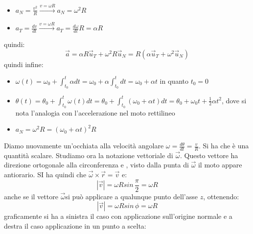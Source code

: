 \documentclass[a4paper,12pt, oneside]{book}
\begin{document}
\begin{itemize}
\item $a_N=\frac{v^2}{R}\xrightarrow{v=\omega R} a_N=\omega^2 R$
\item $a_T=\frac{dv}{dt}\xrightarrow{v=\omega R} a_T=\frac{d\omega}{dt}R=\alpha R$
\end{itemize}
quindi:
$$\vec{a}=\alpha R\vec{u}_T+\omega^2 R\vec{u}_N= R(\alpha \vec{u}_T+\omega^2 \vec{u}_N)$$
quindi infine:
\begin{itemize}
\item $\omega(t)=\omega_0+\int_{t_0}^t \alpha dt=\omega_0+\alpha \int_{t_0}^t dt=\omega_0+\alpha t$ in quanto $t_0=0$
\item $\theta(t)=\theta_0+\int_{t_0}^t \omega (t)dt=\theta_0+\int_{t_0}^t (\omega_0+\alpha t)dt=\theta_0+\omega_0t+\frac{1}{2}\alpha t^2$, dove si nota l'analogia con l'accelerazione nel moto rettilineo
\item $a_N=\omega^2 R=(\omega_0+\alpha t)^2 R$
\end{itemize}
Diamo nuovamente un'occhiata alla velocità angolare $\omega=\frac{d\theta}{dt}=\frac{v}{R}$. Si ha che è una quantità scalare. Studiamo ora la notazione vettoriale di $\vec{\omega}$. Questo vettore ha direzione ortogonale alla circonferenza e , visto dalla punta di $\vec{\omega}$ il moto appare antiorario. SI ha quindi che $\vec{\omega}\times \vec{r}=\vec{v}$ e:
$$|\vec{v}|=\omega Rsin\,\frac{\pi}{2}=\omega R$$
anche se il vettore $\vec{\omega}$si può applicare a qualunque punto dell'asse $z$, ottenendo:
$$|\vec{v}|=\omega Rsin\,\phi=\omega R$$
\newpage
graficamente si ha a sinistra il caso con applicazione sull'origine normale e a destra il caso applicazione in un punto a scelta:
\end{document}
